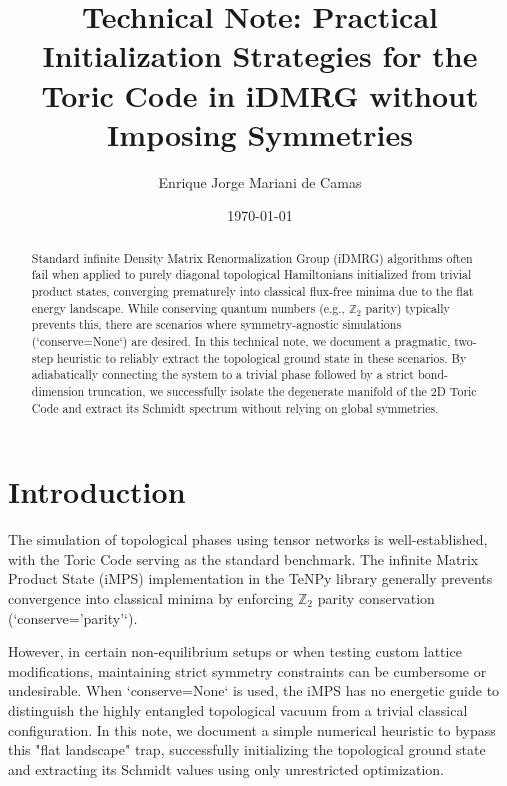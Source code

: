 \documentclass[aps,prb,reprint,superscriptaddress,amsmath,amssymb]{revtex4-2}
\begin{document}
\title{Technical Note: Practical Initialization Strategies for the Toric Code in iDMRG without Imposing Symmetries}

\author{Enrique Jorge Mariani de Camas}

\date{\today}

\begin{abstract}
Standard infinite Density Matrix Renormalization Group (iDMRG) algorithms often fail when applied to purely diagonal topological Hamiltonians initialized from trivial product states, converging prematurely into classical flux-free minima due to the flat energy landscape. While conserving quantum numbers (e.g., $\mathbb{Z}_2$ parity) typically prevents this, there are scenarios where symmetry-agnostic simulations (`conserve=None`) are desired. In this technical note, we document a pragmatic, two-step heuristic to reliably extract the topological ground state in these scenarios. By adiabatically connecting the system to a trivial phase followed by a strict bond-dimension truncation, we successfully isolate the degenerate manifold of the 2D Toric Code and extract its Schmidt spectrum without relying on global symmetries.
\end{abstract}

\maketitle

\section{\label{sec:intro}Introduction}
The simulation of topological phases using tensor networks is well-established, with the Toric Code \cite{kitaev2003} serving as the standard benchmark. The infinite Matrix Product State (iMPS) implementation in the TeNPy library \cite{tenpy2024} generally prevents convergence into classical minima by enforcing $\mathbb{Z}_2$ parity conservation (`conserve='parity'`). 

However, in certain non-equilibrium setups or when testing custom lattice modifications, maintaining strict symmetry constraints can be cumbersome or undesirable. When `conserve=None` is used, the iMPS has no energetic guide to distinguish the highly entangled topological vacuum from a trivial classical configuration. In this note, we document a simple numerical heuristic to bypass this "flat landscape" trap, successfully initializing the topological ground state and extracting its Schmidt values using only unrestricted optimization.
\end{document}
